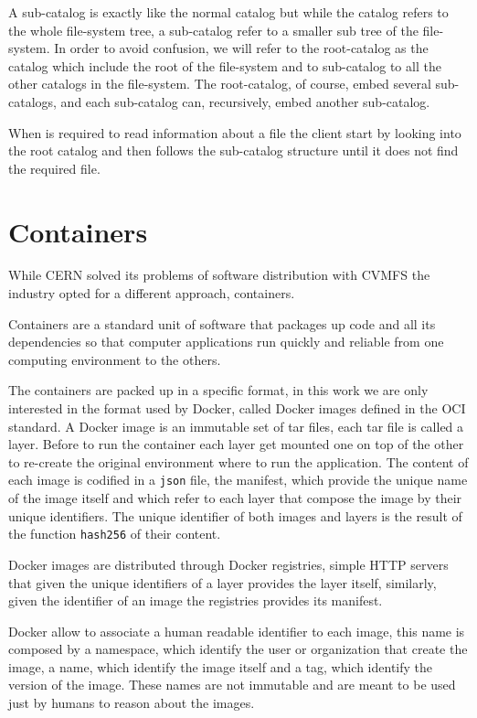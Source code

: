 A sub-catalog is exactly like the normal catalog but while the catalog refers
to the whole file-system tree, a sub-catalog refer to a smaller sub tree of the
file-system. In order to avoid confusion, we will refer to the root-catalog as
the catalog which include the root of the file-system and to sub-catalog to all
the other catalogs in the file-system. The root-catalog, of course, embed
several sub-catalogs, and each sub-catalog can, recursively, embed another
sub-catalog.

When is required to read information about a file the client start by looking
into the root catalog and then follows the sub-catalog structure until it does
not find the required file.

\section{Containers}
\label{sec:containers}

While CERN solved its problems of software distribution with CVMFS the industry
opted for a different approach, containers.

Containers are a standard unit of software that packages up code and all its
dependencies so that computer applications run quickly and reliable from one
computing environment to the others.

The containers are packed up in a specific format, in this work we are only
interested in the format used by Docker, called Docker images defined in the
OCI standard. A Docker image is an immutable set of tar files, each tar file is
called a layer. Before to run the container each layer get mounted one on top
of the other to re-create the original environment where to run the
application. The content of each image is codified in a \texttt{json} file, the
manifest, which provide the unique name of the image itself and which refer to
each layer that compose the image by their unique identifiers. The unique
identifier of both images and layers is the result of the function
\texttt{hash256} of their content.

Docker images are distributed through Docker registries, simple HTTP servers
that given the unique identifiers of a layer provides the layer itself,
similarly, given the identifier of an image the registries provides its
manifest.

Docker allow to associate a human readable identifier to each image, this name
is composed by a namespace, which identify the user or organization that create
the image, a name, which identify the image itself and a tag, which identify
the version of the image. These names are not immutable and are meant to be
used just by humans to reason about the images.

